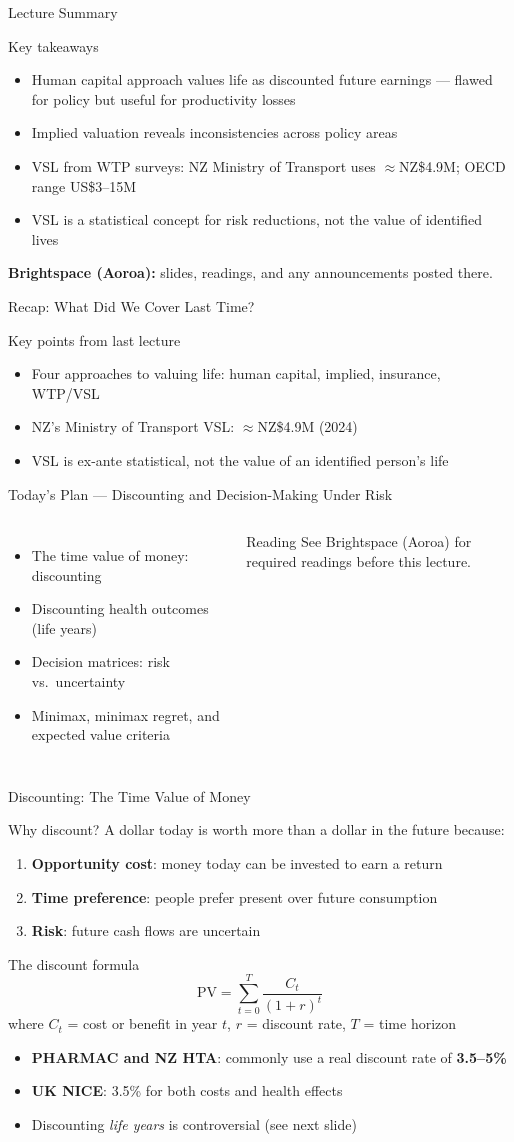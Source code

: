 \documentclass[aspectratio=169, 12pt]{beamer}
\newcommand{\recapslide}[1]{%
  \begin{frame}{Recap: What Did We Cover Last Time?}
    \begin{block}{Key points from last lecture}
      \begin{itemize}#1\end{itemize}
    \end{block}
  \end{frame}}
\newcommand{\planslide}[2]{%
  \begin{frame}{Today's Plan — #1}
    \begin{columns}
      \column{0.6\textwidth}
      \begin{itemize}#2\end{itemize}
      \column{0.38\textwidth}
      \begin{alertblock}{Reading}
        \footnotesize See Brightspace (Aoroa) for required readings before this lecture.
      \end{alertblock}
    \end{columns}
  \end{frame}}
\newcommand{\summaryside}[1]{%
  \begin{frame}{Lecture Summary}
    \begin{exampleblock}{Key takeaways}
      \begin{itemize}#1\end{itemize}
    \end{exampleblock}
    \vspace{0.5em}
    {\footnotesize\textcolor{OtagoGold}{\textbf{Brightspace (Aoroa):}} slides, readings, and any announcements posted there.}
  \end{frame}}
\begin{document}
\summaryside{
  \item Human capital approach values life as discounted future earnings --- flawed for policy but useful for productivity losses
  \item Implied valuation reveals inconsistencies across policy areas
  \item VSL from WTP surveys: NZ Ministry of Transport uses $\approx$NZ\$4.9M; OECD range US\$3--15M
  \item VSL is a statistical concept for risk reductions, not the value of identified lives
}

\recapslide{
  \item Four approaches to valuing life: human capital, implied, insurance, WTP/VSL
  \item NZ's Ministry of Transport VSL: $\approx$NZ\$4.9M (2024)
  \item VSL is ex-ante statistical, not the value of an identified person's life
}

\planslide{Discounting and Decision-Making Under Risk}{
  \item The time value of money: discounting
  \item Discounting health outcomes (life years)
  \item Decision matrices: risk vs.\ uncertainty
  \item Minimax, minimax regret, and expected value criteria
}

\begin{frame}{Discounting: The Time Value of Money}
  \begin{block}{Why discount?}
    A dollar today is worth more than a dollar in the future because:
    \begin{enumerate}
      \item \textbf{Opportunity cost}: money today can be invested to earn a return
      \item \textbf{Time preference}: people prefer present over future consumption
      \item \textbf{Risk}: future cash flows are uncertain
    \end{enumerate}
  \end{block}
  \vspace{0.3em}
  \begin{block}{The discount formula}
    $$\text{PV} = \sum_{t=0}^{T} \frac{C_t}{(1+r)^t}$$
    where $C_t$ = cost or benefit in year $t$, $r$ = discount rate, $T$ = time horizon
  \end{block}
  \begin{itemize}
    \item \textbf{PHARMAC and NZ HTA}: commonly use a real discount rate of \textbf{3.5--5\%}
    \item \textbf{UK NICE}: 3.5\% for both costs and health effects
    \item Discounting \emph{life years} is controversial (see next slide)
  \end{itemize}
\end{frame}
\end{document}
